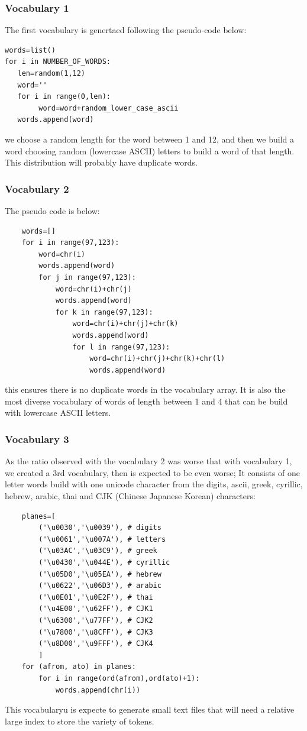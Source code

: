 \documentclass[12pt,a4]{article}
\begin{document}
\subsubsection{Vocabulary 1}
The first vocabulary is genertaed following the pseudo-code below:
\begin{verbatim}
words=list()
for i in NUMBER_OF_WORDS:
   len=random(1,12)
   word=''
   for i in range(0,len):
        word=word+random_lower_case_ascii
   words.append(word)
\end{verbatim}
we choose a random length for the word between 1 and 12, and then we build a word choosing random (lowercase ASCII) letters to build a word of that length.
This distribution will probably have duplicate words.
\subsubsection{Vocabulary 2}
The pseudo code is below:
\begin{verbatim}
    words=[]
    for i in range(97,123):
        word=chr(i)
        words.append(word)
        for j in range(97,123):
            word=chr(i)+chr(j)
            words.append(word)
            for k in range(97,123):
                word=chr(i)+chr(j)+chr(k)
                words.append(word)
                for l in range(97,123):
                    word=chr(i)+chr(j)+chr(k)+chr(l)
                    words.append(word)

\end{verbatim}
this ensures there is no duplicate words in the vocabulary array.
It is also the most diverse vocabulary of words of length between 1 and 4 that can be build with lowercase ASCII letters.
\subsubsection{Vocabulary 3}
As the ratio observed with the vocabulary 2 was worse that with vocabulary 1, we created a 3rd vocabulary, then is expected to be even worse; It consists of one letter words build with one unicode character from the digits, ascii, greek, cyrillic, hebrew, arabic, thai and CJK (Chinese Japanese Korean) characters:
\begin{verbatim}
    planes=[
        ('\u0030','\u0039'), # digits
        ('\u0061','\u007A'), # letters
        ('\u03AC','\u03C9'), # greek
        ('\u0430','\u044E'), # cyrillic
        ('\u05D0','\u05EA'), # hebrew
        ('\u0622','\u06D3'), # arabic
        ('\u0E01','\u0E2F'), # thai
        ('\u4E00','\u62FF'), # CJK1
        ('\u6300','\u77FF'), # CJK2
        ('\u7800','\u8CFF'), # CJK3
        ('\u8D00','\u9FFF'), # CJK4
        ]
    for (afrom, ato) in planes:
        for i in range(ord(afrom),ord(ato)+1):
            words.append(chr(i))
\end{verbatim}
This vocabularyu is expecte to generate small text files that will need a relative large index to store the variety of tokens.
\end{document}
